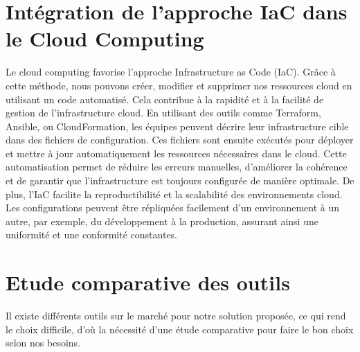 \section{Intégration de l'approche IaC dans le Cloud Computing}
Le cloud computing favorise l'approche Infrastructure as Code (IaC). Grâce à cette méthode, nous pouvons créer, modifier et supprimer nos ressources cloud en utilisant un code automatisé. Cela contribue à la rapidité et à la facilité de gestion de l'infrastructure cloud. En utilisant des outils comme Terraform, Ansible, ou CloudFormation, les équipes peuvent décrire leur infrastructure cible dans des fichiers de configuration. Ces fichiers sont ensuite exécutés pour déployer et mettre à jour automatiquement les ressources nécessaires dans le cloud. Cette automatisation permet de réduire les erreurs manuelles, d'améliorer la cohérence et de garantir que l'infrastructure est toujours configurée de manière optimale. De plus, l'IaC facilite la reproductibilité et la scalabilité des environnements cloud. Les configurations peuvent être répliquées facilement d'un environnement à un autre, par exemple, du développement à la production, assurant ainsi une uniformité et une conformité constantes.

\section{Etude comparative des outils}
Il existe différents outils sur le marché pour notre solution proposée, ce qui rend le choix difficile, d'où la nécessité d'une étude comparative pour faire le bon choix selon nos besoins.

